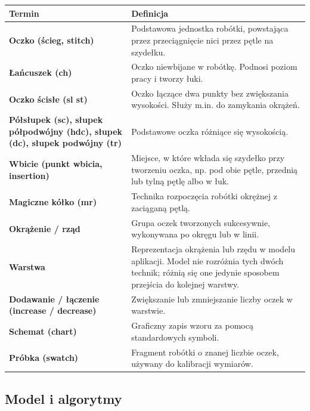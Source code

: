 \documentclass[a4paper,11pt]{article}
\begin{document}
\begin{tabularx}{0.95\textwidth}{|p{5cm}|X|}
  \hline
  \textbf{Termin} & \textbf{Definicja} \\
  \hline
  \textbf{Oczko (ścieg, stitch)} & Podstawowa jednostka robótki, powstająca przez przeciągnięcie nici przez pętle na szydełku. \\
  \hline
  \textbf{Łańcuszek (ch)} & Oczko niewbijane w robótkę. Podnosi poziom pracy i tworzy łuki. \\
  \hline
  \textbf{Oczko ścisłe (sl st)} & Oczko łączące dwa punkty bez zwiększania wysokości. Służy m.in. do zamykania okrążeń. \\
  \hline
  \textbf{Półsłupek (sc), \newline słupek półpodwójny (hdc), \newline słupek (dc), \newline słupek podwójny (tr)} & Podstawowe oczka różniące się wysokością. \\
  \hline
  \textbf{Wbicie (punkt wbicia, insertion)} & Miejsce, w które wkłada się szydełko przy tworzeniu oczka, np. pod obie pętle, przednią lub tylną pętlę albo w łuk. \\
  \hline
  \textbf{Magiczne kółko (mr)} & Technika rozpoczęcia robótki okrężnej z zaciąganą pętlą. \\
  \hline
  \textbf{Okrążenie / rząd} & Grupa oczek tworzonych sukcesywnie, wykonywana po okręgu lub w linii. \\
  \hline
  \textbf{Warstwa} & Reprezentacja okrążenia lub rzędu w modelu aplikacji. Model nie rozróżnia tych dwóch technik; różnią się one jedynie sposobem przejścia do kolejnej warstwy. \\
  \hline
  \textbf{Dodawanie / łączenie (increase / decrease)} & Zwiększanie lub zmniejszanie liczby oczek w warstwie. \\
  \hline
  \textbf{Schemat (chart)} & Graficzny zapis wzoru za pomocą standardowych symboli. \\
  \hline
  \textbf{Próbka (swatch)} & Fragment robótki o znanej liczbie oczek, używany do kalibracji wymiarów. \\
  \hline
\end{tabularx}

\subsection{Model i algorytmy}
\end{document}

